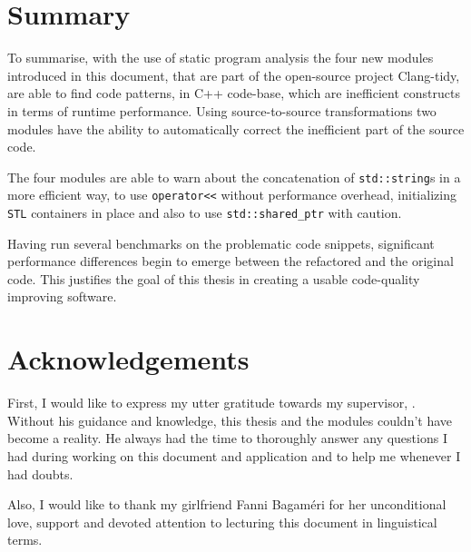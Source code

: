 \section{Summary}
\par To summarise, with the use of static program analysis the four new modules introduced in this document, that are part of the open-source project Clang-tidy, are able to find code patterns, in C++ code-base, which are inefficient constructs in terms of runtime performance. Using source-to-source transformations two modules have the ability to automatically correct the inefficient part of the source code. \medskip
\par The four modules are able to warn about the concatenation of \verb|std::string|s in a more efficient way, to use \verb|operator<<| without performance overhead, initializing \verb|STL| containers in place and also to use \verb|std::shared_ptr| with caution. \medskip
\par Having run several benchmarks on the problematic code snippets, significant performance differences begin to emerge between the refactored and the original code. This justifies the goal of this thesis in creating a usable code-quality improving software.
\pagebreak
\section{Acknowledgements}
\par First, I would like to express my utter gratitude towards my supervisor, \SupervisorName. Without his guidance and knowledge, this thesis and the modules couldn't have become a reality. He always had the time to thoroughly answer any questions I had during working on this document and application and to help me whenever I had doubts. \medskip
\par Also, I would like to thank my girlfriend Fanni Bagaméri for her unconditional love, support and devoted attention to lecturing this document in linguistical terms.